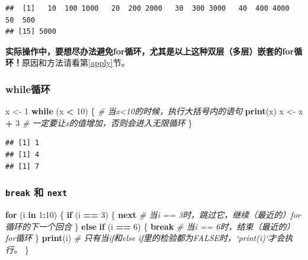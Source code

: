 \documentclass[]{book}
\newenvironment{Shaded}{\begin{snugshade}}{\end{snugshade}}
\newcommand{\CommentTok}[1]{\textcolor[rgb]{0.56,0.35,0.01}{\textit{#1}}}
\newcommand{\ControlFlowTok}[1]{\textcolor[rgb]{0.13,0.29,0.53}{\textbf{#1}}}
\newcommand{\DecValTok}[1]{\textcolor[rgb]{0.00,0.00,0.81}{#1}}
\newcommand{\KeywordTok}[1]{\textcolor[rgb]{0.13,0.29,0.53}{\textbf{#1}}}
\newcommand{\NormalTok}[1]{#1}
\newcommand{\OperatorTok}[1]{\textcolor[rgb]{0.81,0.36,0.00}{\textbf{#1}}}
\newcommand{\StringTok}[1]{\textcolor[rgb]{0.31,0.60,0.02}{#1}}
\begin{document}
\begin{verbatim}
##  [1]   10  100 1000   20  200 2000   30  300 3000   40  400 4000   50  500
## [15] 5000
\end{verbatim}

\textbf{实际操作中，要想尽办法避免for循环，尤其是以上这种双层（多层）嵌套的for循环！}原因和方法请看第\ref{apply}节。

\hypertarget{control-flow-while-loop}{%
\subsubsection{while循环}\label{control-flow-while-loop}}

\begin{Shaded}
\begin{Highlighting}[]
\NormalTok{x <-}\StringTok{ }\DecValTok{1}
\ControlFlowTok{while}\NormalTok{ (x }\OperatorTok{<}\StringTok{ }\DecValTok{10}\NormalTok{) \{ }\CommentTok{# 当x<10的时候，执行大括号内的语句}
  \KeywordTok{print}\NormalTok{(x)}
\NormalTok{  x <-}\StringTok{ }\NormalTok{x }\OperatorTok{+}\StringTok{ }\DecValTok{3} \CommentTok{# 一定要让x的值增加，否则会进入无限循环}
\NormalTok{\}}
\end{Highlighting}
\end{Shaded}

\begin{verbatim}
## [1] 1
## [1] 4
## [1] 7
\end{verbatim}

\hypertarget{control-flow-break-next}{%
\subsubsection{\texorpdfstring{\texttt{break} 和 \texttt{next}}{break 和 next}}\label{control-flow-break-next}}

\begin{Shaded}
\begin{Highlighting}[]
\ControlFlowTok{for}\NormalTok{ (i }\ControlFlowTok{in} \DecValTok{1}\OperatorTok{:}\DecValTok{10}\NormalTok{) \{}
  \ControlFlowTok{if}\NormalTok{ (i }\OperatorTok{==}\StringTok{ }\DecValTok{3}\NormalTok{) \{}
    \ControlFlowTok{next} \CommentTok{# 当i == 3时，跳过它，继续（最近的）for循环的下一个回合}
\NormalTok{  \} }\ControlFlowTok{else} \ControlFlowTok{if}\NormalTok{ (i }\OperatorTok{==}\StringTok{ }\DecValTok{6}\NormalTok{) \{}
    \ControlFlowTok{break} \CommentTok{# 当i == 6时，结束（最近的）for循环}
\NormalTok{  \} }
  \KeywordTok{print}\NormalTok{(i) }\CommentTok{# 只有当if和else if里的检验都为FALSE时，`print(i)`才会执行。}
\NormalTok{\}}
\end{Highlighting}
\end{Shaded}
\end{document}
